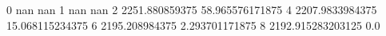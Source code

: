 0 nan nan
1 nan nan
2 2251.880859375 58.965576171875
4 2207.9833984375 15.068115234375
6 2195.208984375 2.293701171875
8 2192.915283203125 0.0
